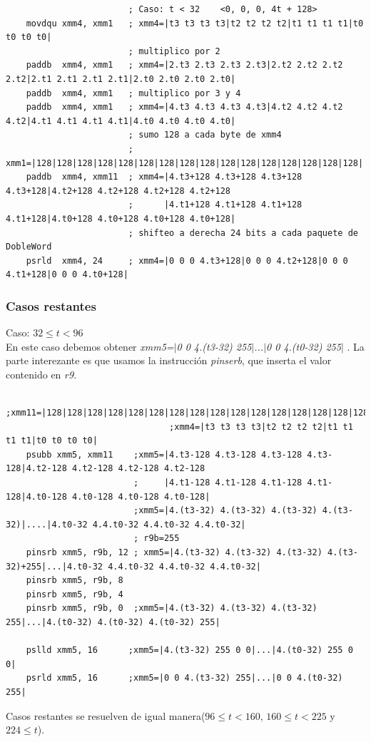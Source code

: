 \begin{codesnippet}
\begin{verbatim}
                        ; Caso: t < 32    <0, 0, 0, 4t + 128>
    movdqu xmm4, xmm1   ; xmm4=|t3 t3 t3 t3|t2 t2 t2 t2|t1 t1 t1 t1|t0 t0 t0 t0|
                        ; multiplico por 2
    paddb  xmm4, xmm1   ; xmm4=|2.t3 2.t3 2.t3 2.t3|2.t2 2.t2 2.t2 2.t2|2.t1 2.t1 2.t1 2.t1|2.t0 2.t0 2.t0 2.t0|   
    paddb  xmm4, xmm1   ; multiplico por 3 y 4
    paddb  xmm4, xmm1   ; xmm4=|4.t3 4.t3 4.t3 4.t3|4.t2 4.t2 4.t2 4.t2|4.t1 4.t1 4.t1 4.t1|4.t0 4.t0 4.t0 4.t0| 
                        ; sumo 128 a cada byte de xmm4
                        ; xmm1=|128|128|128|128|128|128|128|128|128|128|128|128|128|128|128|128|
    paddb  xmm4, xmm11  ; xmm4=|4.t3+128 4.t3+128 4.t3+128 4.t3+128|4.t2+128 4.t2+128 4.t2+128 4.t2+128
                        ;      |4.t1+128 4.t1+128 4.t1+128 4.t1+128|4.t0+128 4.t0+128 4.t0+128 4.t0+128|
                        ; shifteo a derecha 24 bits a cada paquete de DobleWord
    psrld  xmm4, 24     ; xmm4=|0 0 0 4.t3+128|0 0 0 4.t2+128|0 0 0 4.t1+128|0 0 0 4.t0+128|
\end{verbatim}
\end{codesnippet}

\subsubsection*{Casos restantes}
Caso: $32 \leq t < 96$ \\
En este caso debemos obtener \emph{xmm5=$|$0 0 4.(t3-32) 255$|$...$|$0 0 4.(t0-32) 255$|$ }. 
La parte interezante es que usamos la instrucción \emph{pinserb}, que inserta el valor contenido en \emph{r9}.
\begin{codesnippet}
\begin{verbatim}				
                                ;xmm11=|128|128|128|128|128|128|128|128|128|128|128|128|128|128|128|128|
                                ;xmm4=|t3 t3 t3 t3|t2 t2 t2 t2|t1 t1 t1 t1|t0 t0 t0 t0|
    psubb xmm5, xmm11    ;xmm5=|4.t3-128 4.t3-128 4.t3-128 4.t3-128|4.t2-128 4.t2-128 4.t2-128 4.t2-128
                         ;     |4.t1-128 4.t1-128 4.t1-128 4.t1-128|4.t0-128 4.t0-128 4.t0-128 4.t0-128|
                         ;xmm5=|4.(t3-32) 4.(t3-32) 4.(t3-32) 4.(t3-32)|....|4.t0-32 4.4.t0-32 4.4.t0-32 4.4.t0-32|                           
                         ; r9b=255
    pinsrb xmm5, r9b, 12 ; xmm5=|4.(t3-32) 4.(t3-32) 4.(t3-32) 4.(t3-32)+255|...|4.t0-32 4.4.t0-32 4.4.t0-32 4.4.t0-32|
    pinsrb xmm5, r9b, 8  
    pinsrb xmm5, r9b, 4
    pinsrb xmm5, r9b, 0  ;xmm5=|4.(t3-32) 4.(t3-32) 4.(t3-32) 255|...|4.(t0-32) 4.(t0-32) 4.(t0-32) 255|                    

    pslld xmm5, 16      ;xmm5=|4.(t3-32) 255 0 0|...|4.(t0-32) 255 0 0|
    psrld xmm5, 16      ;xmm5=|0 0 4.(t3-32) 255|...|0 0 4.(t0-32) 255|                    
\end{verbatim}
\end{codesnippet}
Casos restantes se resuelven de igual manera($96\leq t < 160$, $160\leq t <225$ y  $224 \leq t$).

